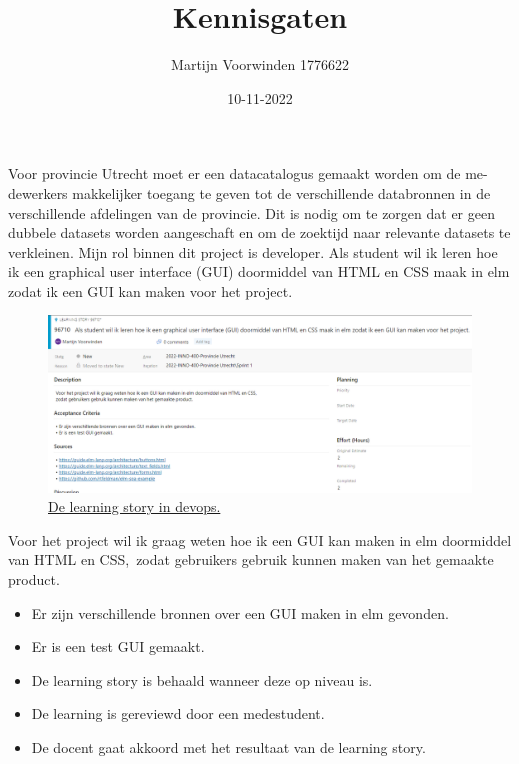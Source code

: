 \documentclass{article}
\title{Kennisgaten}
\author{Martijn Voorwinden 1776622}
\date{10-11-2022}
\newcommand{\ls}[8]{
    \maketitle
    \section*{Kennisgaten}
    \subsection*{Inleiding}
    #1
    \subsection*{Criteria}
    \begin{itemize}
        \item Kennis opdoen en kunnen toepassen binnen context.
    \end{itemize}
    \subsection*{Learning / Research Story}
    \textbf{#2}
    #3
    \subsubsection*{Acceptatiecriteria}
    #4
    \subsubsection*{Definition of Done (DoD)}
    #5
    \subsubsection*{Estimate}
    #6
    \subsubsection*{Artifacten / Realisatie}
    #7
    \subsubsection*{Bronnen}
    #8
}
\begin{document}
    \ls
    {
        Voor provincie Utrecht moet er een datacatalogus gemaakt worden om de me-
        dewerkers makkelijker toegang te geven tot de verschillende databronnen in de
        verschillende afdelingen van de provincie. Dit is nodig om te zorgen dat er geen
        dubbele datasets worden aangeschaft en om de zoektijd naar relevante datasets
        te verkleinen. Mijn rol binnen dit project is developer.
    }
    {
        Als student wil ik leren hoe ik een graphical user interface (GUI) doormiddel van HTML en CSS maak in elm zodat ik een GUI kan maken voor het project.
    }
    {
        \begin{figure}[H]
            \includegraphics[width=\textwidth,height=\textheight,keepaspectratio]{ls_01.png}
            \caption{\href{https://dev.azure.com/HU-HBO-ICT/2022-INNO-400-Provincie\%20Utrecht/_backlogs/backlog/2022-INNO-400-Provincie\%20Utrecht\%20Team/Epics/?workitem=96710}{De learning story in devops.}}
            \label{fig:ls_01}
        \end{figure}
        Voor het project wil ik graag weten hoe ik een GUI kan maken in elm doormiddel van HTML en CSS,\
        zodat gebruikers gebruik kunnen maken van het gemaakte product.
    }
    {
        \begin{itemize}
            \item Er zijn verschillende bronnen over een GUI maken in elm gevonden.
            \item Er is een test GUI gemaakt.
        \end{itemize}
    }
    {
        \begin{itemize}
            \item De learning story is behaald wanneer deze op niveau is.
            \item De learning is gereviewd door een medestudent.
            \item De docent gaat akkoord met het resultaat van de learning story.
        \end{itemize}
    }
\end{document}
